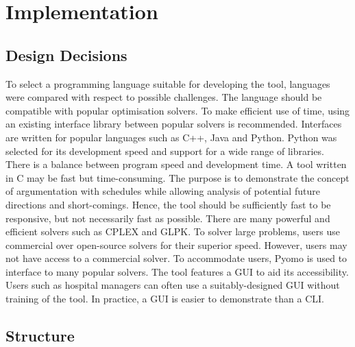 \chapter{Implementation}

\section{Design Decisions}

To select a programming language suitable for developing the tool, languages were compared with respect to possible challenges. The language should be compatible with popular optimisation solvers. To make efficient use of time, using an existing interface library between popular solvers is recommended. Interfaces are written for popular languages such as C++, Java and Python. Python was selected for its development speed and support for a wide range of libraries.
\linespace
There is a balance between program speed and development time. A tool written in C may be fast but time-consuming. The purpose is to demonstrate the concept of argumentation with schedules while allowing analysis of potential future directions and short-comings. Hence, the tool should be sufficiently fast to be responsive, but not necessarily fast as possible.
\linespace
There are many powerful and efficient solvers such as CPLEX and GLPK. To solver large problems, users use commercial over open-source solvers for their superior speed. However, users may not have access to a commercial solver. To accommodate users, Pyomo is used to interface to many popular solvers.
\linespace
The tool features a GUI to aid its accessibility. Users such as hospital managers can often use a suitably-designed GUI without training of the tool. In practice, a GUI is easier to demonstrate than a CLI.

\section{Structure}


